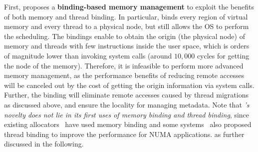 
First, \NM{} proposes a \textbf{binding-based memory management} to exploit the benefits of both memory and thread binding. In particular, \NM{} binds every region of virtual memory and every thread to a physical node, but still allows the OS to perform the scheduling. 
The bindings enable \NM{} to obtain the origin (the physical node) of memory and threads with few instructions inside the user space, which is orders of magnitude lower than invoking system calls (around  $10,000$ cycles for getting the node of the memory). Therefore, it is infeasible to perform more advanced memory management, as the performance benefits of reducing remote accesses will be canceled out by the cost of getting the origin information via system calls.
Further, the binding will eliminate remote accesses caused by thread migrations as discussed above, and ensure the locality for managing metadata.  Note that \textit{\NM{}'s novelty does not lie in its first uses of memory binding and thread binding}, since existing allocators~\cite{tcmallocnuma, mimalloc} have used memory binding and some systems~\cite{li2013numa, XuNuma, Lepers:2015:TMP:2813767.2813788} also proposed thread binding to improve the performance for NUMA applications.  as further discussed in the following. 
%
